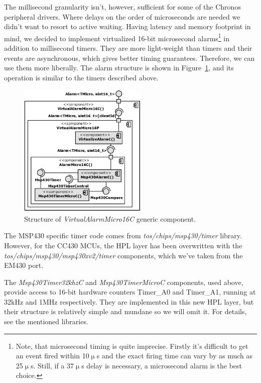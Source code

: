 The millisecond granularity isn't, however, sufficient for some of the Chronos peripheral drivers. Where delays on the order of microseconds are needed we didn't want to resort to active waiting. Having latency and memory footprint in mind, we decided to implement virtualized 16-bit microsecond alarms\footnote{Note, that microsecond timing is quite imprecise. Firstly it's difficult to get an event fired within 10$\upmu$s and the exact firing time can vary by as much as 25$\upmu$s. Still, if a 37$\upmu$s delay is necessary, a microsecond alarm is the best choice.} in addition to millisecond timers. They are more light-weight than timers and their events are asynchronous, which gives better timing guarantees. Therefore, we can use them more liberally. The alarm structure is shown in Figure~\ref{fig:virutal_alarm_micro_16_c}, and its operation is similar to the timers described above.
\begin{figure}[h]
  \centering
  \includegraphics[width=0.55\textwidth]{diagrams/virutal_alarm_micro_16_c.eps}
  \caption{Structure of \emph{VirtualAlarmMicro16C} generic component.}
  \label{fig:virutal_alarm_micro_16_c}
\end{figure}

The MSP430 specific timer code comes from \emph{tos/chips/msp430/timer} library. However, for the CC430 MCUs, the HPL layer has been overwritten with the \emph{tos/chips/msp430/msp430xv2/timer} components, which we've taken from the EM430 port.

The \emph{Msp430Timer32khzC} and  \emph{Msp430TimerMicroC} components, used above, provide access to 16-bit hardware counters Timer\_A0 and Timer\_A1, running at 32kHz and 1MHz respectively. They are implemented in this new HPL layer, but their structure is relatively simple and mundane so we will omit it. For details, see the mentioned libraries.


